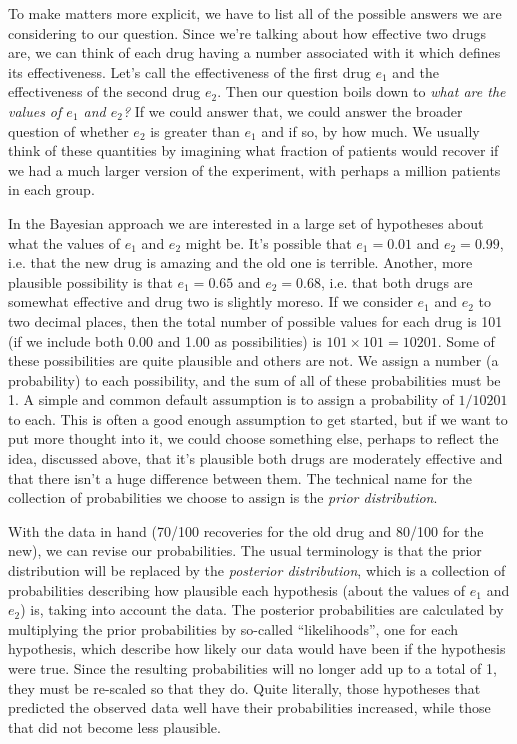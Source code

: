 \documentclass[a4paper, 12pt]{article}
\begin{document}
To make matters more explicit, we have to list all of the possible answers
we are considering to our question. Since we're talking about how effective
two drugs are, we can think of each drug having a number associated with it
which defines its effectiveness. Let's call the effectiveness of the first drug
$e_1$ and the effectiveness of the second drug $e_2$. Then our question boils
down to {\em what are the values of $e_1$ and $e_2$?} If we could answer that,
we could answer the broader question of whether $e_2$ is greater than $e_1$ and
if so, by how much. We usually think of these quantities by imagining what
fraction of patients would recover if we had a much larger version of the
experiment, with perhaps a million patients in each group.

In the Bayesian approach we are interested in a large set of hypotheses about
what the values of $e_1$ and $e_2$ might be. It's possible that $e_1=0.01$ and
$e_2 = 0.99$, i.e. that the new drug is amazing and the old one is terrible.
Another, more plausible possibility is that $e_1 = 0.65$ and $e_2=0.68$, i.e.
that both drugs are somewhat effective and drug two is slightly moreso. If we
consider $e_1$ and $e_2$ to two decimal places, then the total number of
possible values for each drug is 101 (if we include both 0.00 and 1.00 as
possibilities) is $101 \times 101 = 10201$.
Some of these possibilities are
quite plausible and others are not. We assign a number (a probability) to each
possibility, and the sum of all of these probabilities must be 1. A simple and
common default assumption is to assign a probability of $1/10201$ to each.
This is often a good enough assumption to get started, but if we want to put
more thought into it, we could choose something else, perhaps to reflect the
idea, discussed above, that it's plausible both drugs are moderately effective
and that there isn't a huge difference between them.
The technical name for the collection of
probabilities we choose to assign is the {\em prior distribution}.

With the data in hand (70/100 recoveries for the old drug and 80/100 for the
new), we can revise our probabilities. The usual terminology is that the
prior distribution will be replaced by the {\em posterior distribution}, which
is a collection of probabilities describing how plausible each hypothesis
(about the values of $e_1$ and $e_2$) is, taking into account the data.
The posterior probabilities are calculated by multiplying the prior probabilities
by so-called ``likelihoods'', one for each hypothesis,
which describe how likely our data would have been if the hypothesis were true.
Since the resulting probabilities will no longer add up to a total of 1, they
must be re-scaled so that they do.
Quite literally, those hypotheses that predicted the observed data well have
their probabilities increased, while those that did not become less
plausible. 
\end{document}
